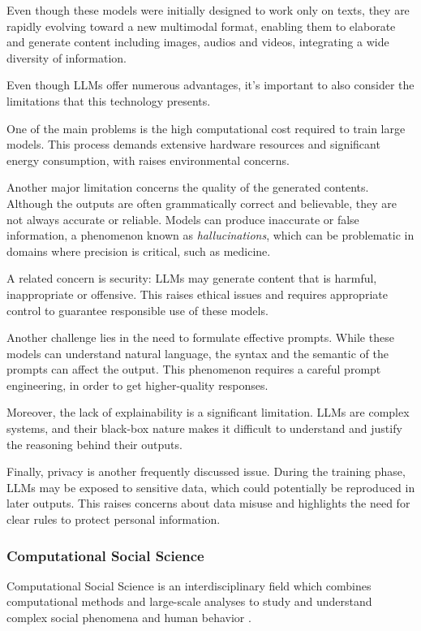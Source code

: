 \medskip
Even though these models were initially designed to work only on texts, they are rapidly evolving toward a new multimodal format, enabling them to elaborate and generate content including images, audios and videos, integrating a wide diversity of information.


\medskip
Even though LLMs offer numerous advantages, it's important to also consider the limitations that this technology presents.

One of the main problems is the high computational cost required to train large models.
This process demands extensive hardware resources and significant energy consumption, with raises environmental concerns.

Another major limitation concerns the quality of the generated contents. Although the outputs are often grammatically correct and believable, they are not always accurate or reliable. Models can produce inaccurate or false information, a phenomenon known as \textit{hallucinations}, which can be problematic in domains where precision is critical, such as medicine.

A related concern is security: LLMs may generate content that is harmful, inappropriate or offensive. This raises ethical issues and requires appropriate control to guarantee responsible use of these models.

Another challenge lies in the need to formulate effective prompts. While these models can understand natural language, the syntax and the semantic of the prompts can affect the output. This phenomenon requires a careful prompt engineering, in order to get higher-quality responses.

Moreover, the lack of explainability is a significant limitation. LLMs are complex systems, and their black-box nature makes it difficult to understand and justify the reasoning behind their outputs.

Finally, privacy is another frequently discussed issue. During the training phase, LLMs may be exposed to sensitive data, which could potentially be reproduced in later outputs. This raises concerns about data misuse and highlights the need for clear rules to protect personal information.


\subsubsection{Computational Social Science}
Computational Social Science \cite{lazer2009computational} is an interdisciplinary field which combines computational methods and large-scale analyses to study and understand complex social phenomena and human behavior \cite{conte2012manifesto, thapa2025llm}.


